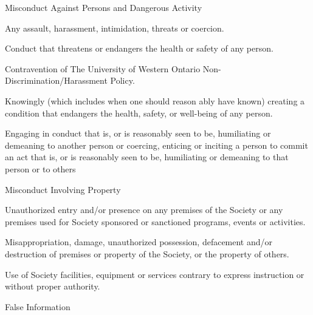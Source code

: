 \begin{longenum}[ label*=\arabic*., align=left]
\begin{longenum}[ label*=\arabic*., align=left]
                  
                  \item Misconduct Against Persons and Dangerous Activity
                 \begin{longenum}[ label*=\arabic*., align=left]
                       \item Any assault, harassment, intimidation, threats or coercion.
                       \item Conduct that threatens or endangers the health or safety of any person.
                       \item Contravention  of  The  University  of  Western  Ontario  Non-Discrimination/Harassment Policy.
                       \item Knowingly  (which  includes  when  one  should  reason ably  have  known)  creating  a condition that endangers the health, safety, or well-being of any person.
                       \item Engaging in conduct that is, or is reasonably seen to be, humiliating or demeaning to another  person  or  coercing,  enticing  or  inciting  a  person  to commit  an  act  that  is,  or  is reasonably seen to be, humiliating or demeaning to that person or to others
\end{longenum}
             \item Misconduct Involving Property
                 \begin{longenum}[ label*=\arabic*., align=left]

                        \item Unauthorized entry and/or presence on any premises of the Society or any premises used for Society sponsored or sanctioned programs, events or activities.
                        \item Misappropriation,  damage,  unauthorized  possession,  defacement  and/or  destruction of premises or property of the Society, or the property of others.
                        \item Use  of  Society  facilities,  equipment  or  services  contrary  to  express  instruction  or without proper authority.
                  \end{longenum}
             
               \item False Information
                  \begin{longenum}[ label*=\arabic*., align=left]


\end{longenum}
\end{longenum}
\end{longenum}
